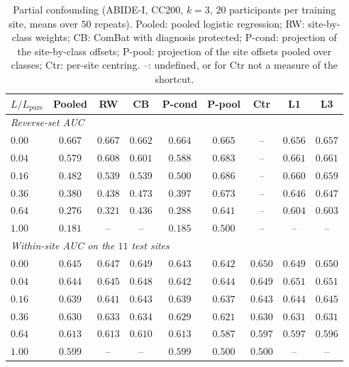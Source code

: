 \begin{table}[h]
\centering
\caption{Partial confounding (ABIDE-I, CC200, $k=3$, $20$ participants per training site, means over $50$ repeats). Pooled: pooled logistic regression; RW: site-by-class weights; CB: ComBat with diagnosis protected; P-cond: projection of the site-by-class offsets; P-pool: projection of the site offsets pooled over classes; Ctr: per-site centring. --: undefined, or for Ctr not a measure of the shortcut.}
\label{tab:partial}
\small
\begin{tabular}{lcccccccc}
\toprule
$L/L_{\mathrm{pure}}$ & Pooled & RW & CB & P-cond & P-pool & Ctr & L1 & L3\\
\midrule
\multicolumn{9}{l}{\emph{Reverse-set AUC}}\\
$0.00$ & $0.667$ & $0.667$ & $0.662$ & $0.664$ & $0.665$ & -- & $0.656$ & $0.657$\\
$0.04$ & $0.579$ & $0.608$ & $0.601$ & $0.588$ & $0.683$ & -- & $0.661$ & $0.661$\\
$0.16$ & $0.482$ & $0.539$ & $0.539$ & $0.500$ & $0.686$ & -- & $0.660$ & $0.659$\\
$0.36$ & $0.380$ & $0.438$ & $0.473$ & $0.397$ & $0.673$ & -- & $0.646$ & $0.647$\\
$0.64$ & $0.276$ & $0.321$ & $0.436$ & $0.288$ & $0.641$ & -- & $0.604$ & $0.603$\\
$1.00$ & $0.181$ & -- & -- & $0.185$ & $0.500$ & -- & -- & --\\
\midrule
\multicolumn{9}{l}{\emph{Within-site AUC on the $11$ test sites}}\\
$0.00$ & $0.645$ & $0.647$ & $0.649$ & $0.643$ & $0.642$ & $0.650$ & $0.649$ & $0.650$\\
$0.04$ & $0.644$ & $0.645$ & $0.648$ & $0.642$ & $0.644$ & $0.649$ & $0.651$ & $0.651$\\
$0.16$ & $0.639$ & $0.641$ & $0.643$ & $0.639$ & $0.637$ & $0.643$ & $0.644$ & $0.645$\\
$0.36$ & $0.630$ & $0.633$ & $0.634$ & $0.629$ & $0.621$ & $0.630$ & $0.631$ & $0.631$\\
$0.64$ & $0.613$ & $0.613$ & $0.610$ & $0.613$ & $0.587$ & $0.597$ & $0.597$ & $0.596$\\
$1.00$ & $0.599$ & -- & -- & $0.599$ & $0.500$ & $0.500$ & -- & --\\
\bottomrule
\end{tabular}
\end{table}
